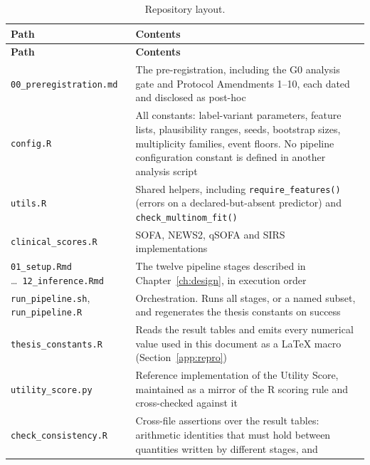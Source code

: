 {\small
\begin{longtable}{p{4.6cm}p{8.4cm}}
    \caption{Repository layout.}\label{tab:repo_layout}\\
    \toprule
    \textbf{Path} & \textbf{Contents} \\
    \midrule
    \endfirsthead
    \toprule
    \textbf{Path} & \textbf{Contents} \\
    \midrule
    \endhead
    \bottomrule
    \endfoot

        \texttt{00\_preregistration.md} &
        The pre-registration, including the G0 analysis gate and Protocol
        Amendments 1--10, each dated and disclosed as post-hoc \\
        \addlinespace
        \texttt{config.R} &
        All constants: label-variant parameters, feature lists, plausibility
        ranges, seeds, bootstrap sizes, multiplicity families, event floors.
        No pipeline configuration constant is defined in another analysis
        script \\
        \addlinespace
        \texttt{utils.R} &
        Shared helpers, including \texttt{require\_features()} (errors on a
        declared-but-absent predictor) and \texttt{check\_multinom\_fit()} \\
        \addlinespace
        \texttt{clinical\_scores.R} &
        SOFA, NEWS2, qSOFA and SIRS implementations \\
        \addlinespace
        \texttt{01\_setup.Rmd} \dots\ \texttt{12\_inference.Rmd} &
        The twelve pipeline stages described in Chapter~\ref{ch:design}, in
        execution order \\
        \addlinespace
        \texttt{run\_pipeline.sh}, \texttt{run\_pipeline.R} &
        Orchestration. Runs all stages, or a named subset, and regenerates the
        thesis constants on success \\
        \addlinespace
        \texttt{thesis\_constants.R} &
        Reads the result tables and emits every numerical value used in this
        document as a \LaTeX{} macro (Section~\ref{app:repro}) \\
        \addlinespace
        \texttt{utility\_score.py} &
        Reference implementation of the Utility Score, maintained as a mirror
        of the R scoring rule and cross-checked against it \\
        \addlinespace
        \texttt{check\_consistency.R} &
        Cross-file assertions over the result tables: arithmetic identities
        that must hold between quantities written by different stages, and

\end{longtable}}
